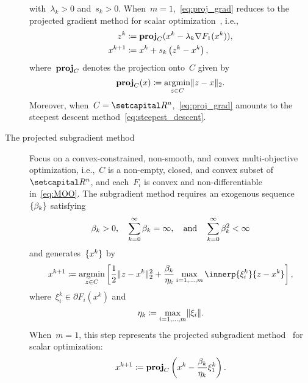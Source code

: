 \documentclass[../../main]{subfiles}
\begin{document}
\begin{example}
\begin{description}
\[            \] 
            with~$\lambda_k > 0$ and~$s_k > 0$.
            When~$m = 1$,~\cref{eq:proj_grad} reduces to the projected gradient method for scalar optimization~\cite{Polyak1963,Goldstein1964,Goldstein1967,McCormick1969}, i.e.,
            \[
                \begin{aligned}
                    z^k &\coloneqq \operatorname{\mathbf{proj}}_C (x^k - \lambda_k \nabla F_1(x^k)), \\
                    x^{k + 1} &\coloneqq x^k + s_k \left( z^k - x^k \right)
                ,\end{aligned}
            \] 
            where~$\operatorname{\mathbf{proj}}_C$ denotes the projection onto~$C$ given by
            \[ \label{eq:proj}
                \operatorname{\mathbf{proj}}_C(x) \coloneqq \operatorname*{argmin}_{z \in C} \lVert z - x\rVert_2
            .\] 
            Moreover, when~$C = \setR^n$,~\cref{eq:proj_grad} amounts to the steepest descent method~\cref{eq:steepest_descent}.
        \item[The projected subgradient method~\cite{Bello-Cruz2013}]
            Focus on a convex-constrained, non-smooth, and convex multi-objective optimization, i.e.,~$C$ is a non-empty, closed, and convex subset of~$\setR^n$, and each~$F_i$ is convex and non-differentiable in~\cref{eq:MOO}.
            The subgradient method requires an exogenous sequence~$\lbrace\beta_k\rbrace$ satisfying
            \[
                \beta_k > 0, \quad \sum_{k = 0}^{\infty} \beta_k = \infty, \quad \text{and} \quad \sum_{k = 0}^{\infty} \beta_k^2 < \infty 
            \] 
            and generates~$\lbrace x^k\rbrace$ by
            \[
                    x^{k + 1} \coloneqq \argmin_{z \in C} \left[ \frac{1}{2} \norm{z - x^k}_2^2 + \frac{\beta_k}{\eta_k} \max_{i = 1, \dots, m} \innerp{\xi^k_i}{z - x^k} \right] 
            ,\] 
            where~$\xi^k_i \in \partial F_i(x^k)$ and
            \[
                \eta_k \coloneqq \max_{i = 1, \dots, m} \lVert\xi_i\rVert
            .\] 
            When~$m = 1$, this step represents the projected subgradient method~\cite{Polyak1967,Polyak1969,Shor1985,Alber1998,Alber2001} for scalar optimization:
            \[
                x^{k + 1} \coloneqq \operatorname{\mathbf{proj}}_C\left( x^k - \frac{\beta_k}{\eta_k} \xi^k_1 \right) 
            .\] 
    \end{description}
\end{example}
\end{document}
